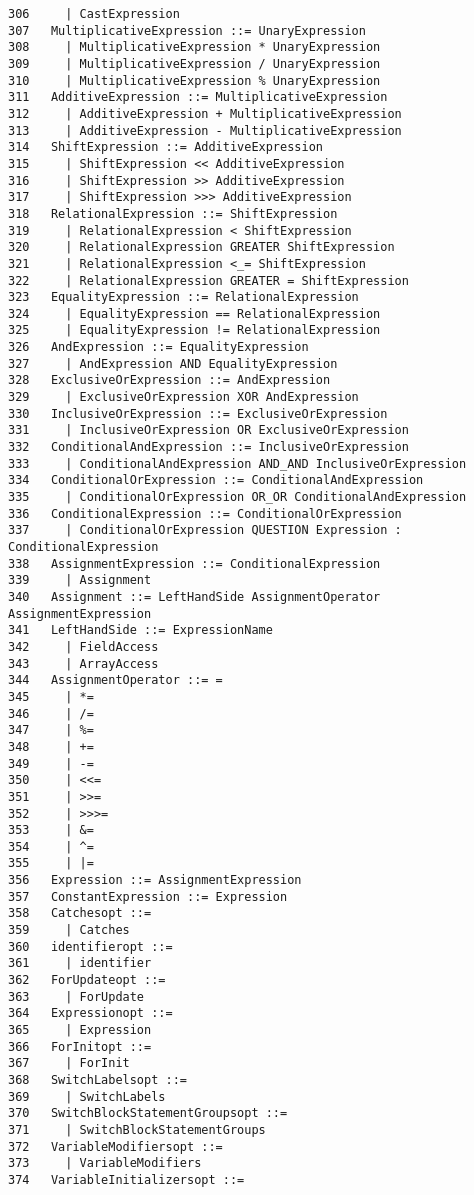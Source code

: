\begin{verbatim}
306     | CastExpression
307   MultiplicativeExpression ::= UnaryExpression
308     | MultiplicativeExpression * UnaryExpression
309     | MultiplicativeExpression / UnaryExpression
310     | MultiplicativeExpression % UnaryExpression
311   AdditiveExpression ::= MultiplicativeExpression
312     | AdditiveExpression + MultiplicativeExpression
313     | AdditiveExpression - MultiplicativeExpression
314   ShiftExpression ::= AdditiveExpression
315     | ShiftExpression << AdditiveExpression
316     | ShiftExpression >> AdditiveExpression
317     | ShiftExpression >>> AdditiveExpression
318   RelationalExpression ::= ShiftExpression
319     | RelationalExpression < ShiftExpression
320     | RelationalExpression GREATER ShiftExpression
321     | RelationalExpression <_= ShiftExpression
322     | RelationalExpression GREATER = ShiftExpression
323   EqualityExpression ::= RelationalExpression
324     | EqualityExpression == RelationalExpression
325     | EqualityExpression != RelationalExpression
326   AndExpression ::= EqualityExpression
327     | AndExpression AND EqualityExpression
328   ExclusiveOrExpression ::= AndExpression
329     | ExclusiveOrExpression XOR AndExpression
330   InclusiveOrExpression ::= ExclusiveOrExpression
331     | InclusiveOrExpression OR ExclusiveOrExpression
332   ConditionalAndExpression ::= InclusiveOrExpression
333     | ConditionalAndExpression AND_AND InclusiveOrExpression
334   ConditionalOrExpression ::= ConditionalAndExpression
335     | ConditionalOrExpression OR_OR ConditionalAndExpression
336   ConditionalExpression ::= ConditionalOrExpression
337     | ConditionalOrExpression QUESTION Expression : ConditionalExpression
338   AssignmentExpression ::= ConditionalExpression
339     | Assignment
340   Assignment ::= LeftHandSide AssignmentOperator AssignmentExpression
341   LeftHandSide ::= ExpressionName
342     | FieldAccess
343     | ArrayAccess
344   AssignmentOperator ::= =
345     | *=
346     | /=
347     | %=
348     | +=
349     | -=
350     | <<=
351     | >>=
352     | >>>=
353     | &=
354     | ^=
355     | |=
356   Expression ::= AssignmentExpression
357   ConstantExpression ::= Expression
358   Catchesopt ::=
359     | Catches
360   identifieropt ::=
361     | identifier
362   ForUpdateopt ::=
363     | ForUpdate
364   Expressionopt ::=
365     | Expression
366   ForInitopt ::=
367     | ForInit
368   SwitchLabelsopt ::=
369     | SwitchLabels
370   SwitchBlockStatementGroupsopt ::=
371     | SwitchBlockStatementGroups
372   VariableModifiersopt ::=
373     | VariableModifiers
374   VariableInitializersopt ::=

\end{verbatim}
